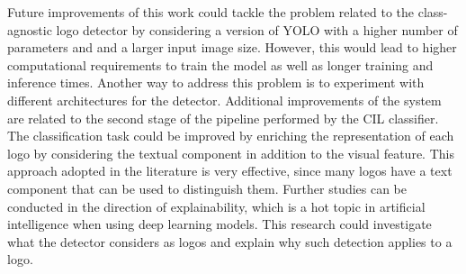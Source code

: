 Future improvements of this work could tackle the problem related to the class-agnostic logo detector by considering a version of YOLO \cite{glenn_jocher_2021_5563715} with a higher number of parameters and and a larger input image size.
However, this would lead to higher computational requirements to train the model as well as longer training and inference times.
Another way to address this problem is to experiment with different architectures for the detector.
Additional improvements of the system are related to the second stage of the pipeline performed by the CIL classifier.
The classification task could be improved by enriching the representation of each logo by considering the textual component in addition to the visual feature.
This approach adopted in the literature is very effective, since many logos have a text component that can be used to distinguish them.
Further studies can be conducted in the direction of explainability, which is a hot topic in artificial intelligence when using deep learning models. This research could investigate what the detector considers as logos and explain why such detection applies to a logo.
